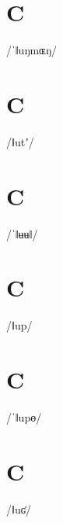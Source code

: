 \documentclass[10pt,a4paper,twoside]{book}
\begin{document}
\section*{C}

\begin{multicols}{3}
 {/ˈǁuŋmɶŋ/} {}
\end{multicols}

\section*{C}

\begin{multicols}{3}
 {/ǁutʼ/} {}
\end{multicols}

\section*{C}

\begin{multicols}{3}
 {/ˈǁʉʉǁ/} {}
\end{multicols}

\section*{C}

\begin{multicols}{3}
 {/ǁup/} {}
\end{multicols}

\section*{C}

\begin{multicols}{3}
 {/ˈǁupɵ/} {}
\end{multicols}

\section*{C}

\begin{multicols}{3}
 {/ǁuʛ/} {}
\end{multicols}
\end{document}
